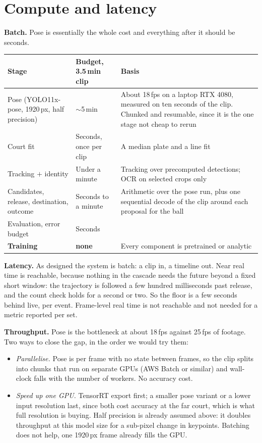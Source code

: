 \documentclass[10pt,a4paper]{article}
\begin{document}
\section{Compute and latency}
\label{sec:compute}

\textbf{Batch.} Pose is essentially the whole cost and everything after it
should be seconds.

{\footnotesize
\begin{xltabular}{\textwidth}{L{34mm} L{30mm} X}
\toprule
\textbf{Stage} & \textbf{Budget, 3.5\,min clip} & \textbf{Basis}\\
\midrule
Pose (YOLO11x-pose, 1920\,px, half precision) & $\sim$5\,min & About 18\,fps on a laptop RTX 4080, measured on ten seconds of the clip. Chunked and resumable, since it is the one stage not cheap to rerun\\
Court fit & Seconds, once per clip & A median plate and a line fit\\
Tracking $+$ identity & Under a minute & Tracking over precomputed detections; OCR on selected crops only\\
Candidates, release, destination, outcome & Seconds to a minute & Arithmetic over the pose run, plus one sequential decode of the clip around each proposal for the ball\\
Evaluation, error budget & Seconds & \\
\midrule
\textbf{Training} & \textbf{none} & Every component is pretrained or analytic\\
\bottomrule
\end{xltabular}}

\textbf{Latency.} As designed the system is batch: a clip in, a timeline out. Near real
time is reachable, because nothing in the cascade needs the future beyond a fixed short
window: the trajectory is followed a few hundred milliseconds past release, and the count
check holds for a second or two. So the floor is a few seconds behind live, per event.
Frame-level real time is not reachable and not needed for a metric reported per set.

\textbf{Throughput.} Pose is the bottleneck at about 18\,fps against 25\,fps of footage.
Two ways to close the gap, in the order we would try them:
\begin{itemize}
\item \emph{Parallelise.} Pose is per frame with no state between frames, so the clip splits
into chunks that run on separate GPUs (AWS Batch or similar) and wall-clock falls with the
number of workers. No accuracy cost.
\item \emph{Speed up one GPU.} TensorRT export first; a smaller pose variant or a lower
input resolution last, since both cost accuracy at the far court, which is what full
resolution is buying. Half precision is already assumed above: it doubles throughput at this
model size for a sub-pixel change in keypoints. Batching does not help, one 1920\,px frame
already fills the GPU.
\end{itemize}
\end{document}
